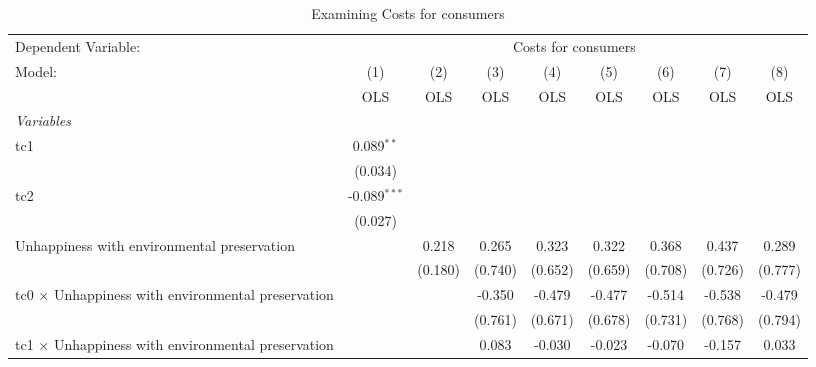 
\begin{table}[htbp]
   \caption{Examining Costs for consumers}
   \centering
   \begin{tabular}{lcccccccc}
      \toprule
      Dependent Variable: & \multicolumn{8}{c}{Costs for consumers}\\
      Model:                                                    & (1)            & (2)     & (3)     & (4)           & (5)           & (6)           & (7)           & (8)\\  
                                                                &  OLS           & OLS     & OLS     & OLS           & OLS           & OLS           & OLS           & OLS\\  
      \midrule
      \emph{Variables}\\
      tc1                                                       & 0.089$^{**}$   &         &         &               &               &               &               &   \\   
                                                                & (0.034)        &         &         &               &               &               &               &   \\   
      tc2                                                       & -0.089$^{***}$ &         &         &               &               &               &               &   \\   
                                                                & (0.027)        &         &         &               &               &               &               &   \\   
      Unhappiness with environmental preservation               &                & 0.218   & 0.265   & 0.323         & 0.322         & 0.368         & 0.437         & 0.289\\   
                                                                &                & (0.180) & (0.740) & (0.652)       & (0.659)       & (0.708)       & (0.726)       & (0.777)\\   
      tc0 $\times$ Unhappiness with environmental preservation  &                &         & -0.350  & -0.479        & -0.477        & -0.514        & -0.538        & -0.479\\   
                                                                &                &         & (0.761) & (0.671)       & (0.678)       & (0.731)       & (0.768)       & (0.794)\\   
      tc1 $\times$ Unhappiness with environmental preservation  &                &         & 0.083   & -0.030        & -0.023        & -0.070        & -0.157        & 0.033\\   

\end{tabular}
\end{table}
